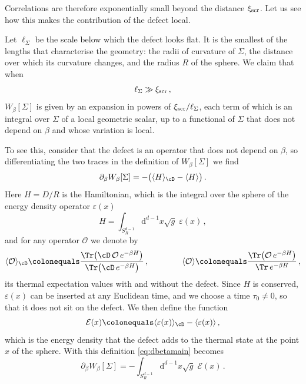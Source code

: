 \documentclass[a4paper,11pt]{article}
\newcommand{\xiscr}{\xi_{\rm scr}}
\newcommand{\dd}{\mathrm{d}}
\begin{document}
Correlations are therefore exponentially small beyond the distance $\xiscr$. Let us see how this makes the contribution of the defect local.

Let $\ell_\Sigma$ be the scale below which the defect looks flat. It is the smallest of the lengths that characterise the geometry: the radii of curvature of $\Sigma$, the distance over which its curvature changes, and the radius $R$ of the sphere. We claim that when
\begin{equation}\label{eq:hier}
	\ell_\Sigma\gg\xiscr\, ,
\end{equation}
$W_\beta[\Sigma]$ is given by an expansion in powers of $\xiscr/\ell_\Sigma$, each term of which is an integral over $\Sigma$ of a local geometric scalar, up to a functional of $\Sigma$ that does not depend on $\beta$ and whose variation is local.


To see this, consider that the defect is an operator that does not depend on $\beta$, so differentiating the two traces in the definition of $W_\beta[\Sigma]$ we find
	\begin{equation}\label{eq:dbetamain}
		\partial_\beta W_\beta[\Sigma]=-\bigl(\langle H\rangle_{\cD}-\langle H\rangle\bigr)\, .
	\end{equation}
	Here $H=D/R$ is the Hamiltonian, which is the integral over the sphere of the energy density operator $\varepsilon(x)$
	\begin{equation}
		H=\int_{S^{d-1}_R}\dd^{d-1}x\sqrt g\;\varepsilon(x)\, ,
	\end{equation} 
	and for any operator $\mathcal{O}$ we denote by
	\begin{equation}\label{eq:vevs}
		\langle\mathcal{O}\rangle_{\cD}\colonequals\frac{\Tr\bigl(\cD\,\mathcal{O}\,e^{-\beta H}\bigr)}{\Tr\bigl(\cD\,e^{-\beta H}\bigr)}\, ,\qquad\qquad
		\langle\mathcal{O}\rangle\colonequals\frac{\Tr\bigl(\mathcal{O}\,e^{-\beta H}\bigr)}{\Tr\,e^{-\beta H}}\, ,
	\end{equation}
	its thermal expectation values with and without the defect. 
	Since $H$ is conserved, $\varepsilon(x)$ can be inserted at any Euclidean time, and we choose a time $\tau_0\neq0$, so that it does not sit on the defect. We then define the function
	\begin{equation}\label{eq:calE}
		\mathcal{E}(x)\colonequals\langle\varepsilon(x)\rangle_{\cD}-\langle\varepsilon(x)\rangle\, ,
	\end{equation}
	which is the energy density that the defect adds to the thermal state at the point $x$ of the sphere. With this definition \eqref{eq:dbetamain} becomes
	\begin{equation}\label{eq:dbetaE}
		\partial_\beta W_\beta[\Sigma]=-\int_{S^{d-1}_R}\dd^{d-1}x\sqrt g\;\mathcal{E}(x)\, .
	\end{equation}
	
\end{document}
